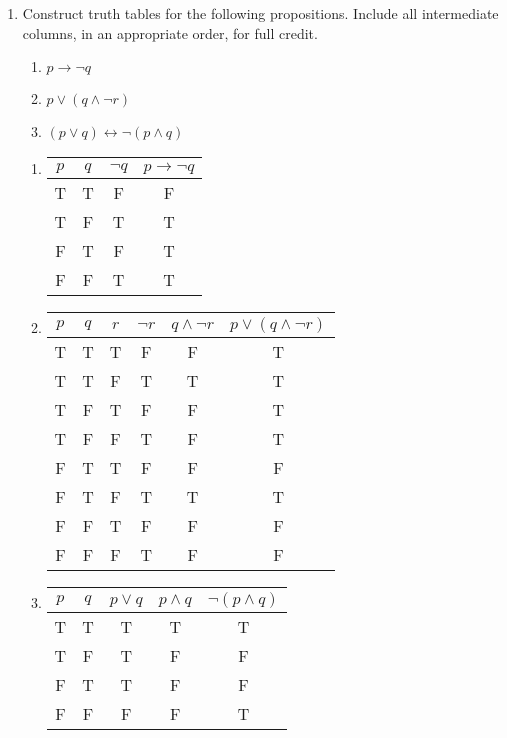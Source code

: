 \begin{enumerate}
    \item Construct truth tables for the following propositions. Include all intermediate columns, in an appropriate order, for full credit. 
    
    \begin{enumerate}
        \item $p \rightarrow \lnot q$
        \item $p \vee (q \wedge \lnot r)$
        
        \item $(p \vee q) \leftrightarrow \lnot (p \wedge q)$
    \end{enumerate}
    
    \begin{solution}
    \begin{enumerate}
        \item
            \begin{tabular}{c|c|c|c}
                $p$ & $q$ & $\neg q$ & $p \rightarrow \neg q$  \\
                \hline
                T & T & F & F\\
                T & F & T & T\\
                F & T & F & T\\
                F & F & T & T\\
            \end{tabular}
        \item 
            \begin{tabular}{c|c|c|c|c|c}
                $p$ & $q$ & $r$ & $\neg r$ & $q \land \neg r$ & $p \lor (q \land \neg r)$\\
                \hline
                T & T & T & F & F & T \\
                T & T & F & T & T & T \\
                T & F & T & F & F & T \\
                T & F & F & T & F & T \\
                F & T & T & F & F & F \\
                F & T & F & T & T & T \\
                F & F & T & F & F & F \\
                F & F & F & T & F & F \\
            \end{tabular}
        \item
            \begin{tabular}{c|c|c|c|c}
                $p$ & $q$ & $p \lor q$ & $p \land q$ & $\neg (p \land q)$ \\
                \hline
                T & T & T & T & T\\
                T & F & T & F & F\\
                F & T & T & F & F\\
                F & F & F & F & T\\
            \end{tabular}
    \end{enumerate}
    \end{solution}
    

\end{enumerate}
